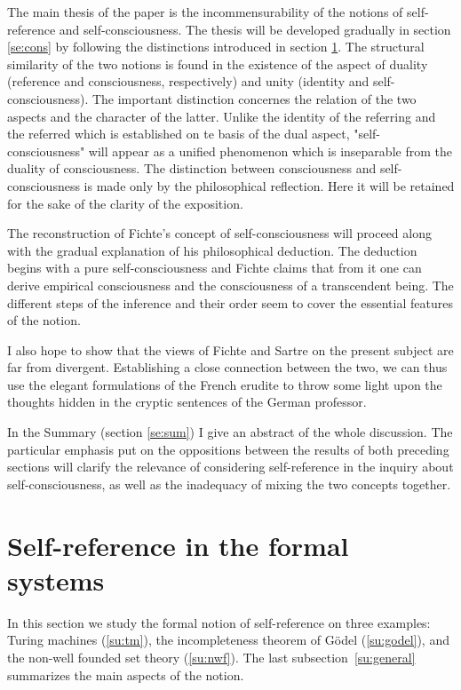 The main thesis of the paper is the incommensurability of the notions of self-reference and
self-consciousness. The thesis will be developed gradually in section \ref{se:cons} by
following the distinctions introduced in section \ref{se:formal}. The structural similarity
of the two notions is found in the existence of the aspect of duality (reference and 
consciousness, respectively) and unity (identity and self-consciousness). The important
distinction concernes the relation of the two aspects and the character of the latter.
Unlike the identity of the referring and the referred which is established on te basis of the
dual aspect, "self-consciousness" will appear as 
a unified phenomenon which is inseparable from the duality of consciousness. 
The distinction between consciousness and self-consciousness is made only by the philosophical reflection. Here it will be retained for the sake of the clarity of the 
exposition.

The reconstruction of Fichte's concept of self-consciousness will proceed along with the gradual explanation of 
his philosophical deduction. The deduction begins with a pure self-consciousness and Fichte claims that from it 
one can derive empirical consciousness and the consciousness of a transcendent being. The different steps of the 
inference and their order seem to cover the essential features of the notion.

I also hope to show that the views of Fichte and Sartre on the present subject are far from divergent. 
Establishing a close connection between the two, we can thus use the elegant formulations 
of the French erudite 
to throw some light upon the thoughts hidden in the cryptic sentences of the German 
professor.

In the Summary (section \ref{se:sum}) I give an abstract of the whole discussion. 
The particular emphasis put on the oppositions 
between the results of both preceding sections will clarify the relevance of considering self-reference in the inquiry about self-consciousness, as well as the inadequacy of mixing the two concepts together. 


\section{Self-reference in the formal systems}\label{se:formal}
In this section we study the formal notion of self-reference on three examples: Turing machines (\ref{su:tm}), 
the incompleteness theorem of G\"{o}del (\ref{su:godel}), and the non-well founded set theory (\ref{su:nwf}). The last subsection~\ref{su:general} summarizes the main aspects of the notion.

